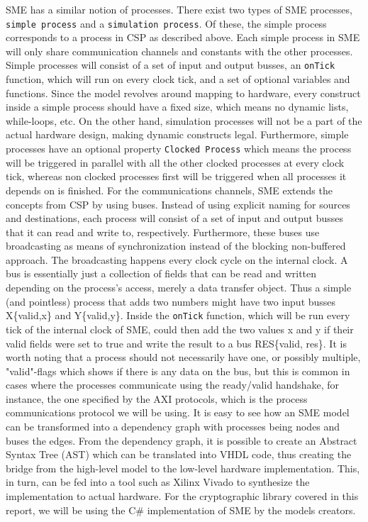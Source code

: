 \documentclass[a4paper, openany]{book}
\begin{document}
\begin{abstact}
SME has a similar notion of processes. There exist two types of SME processes, \texttt{simple process} and a \texttt{simulation process}. Of these, the simple process corresponds to a process in CSP as described above. Each simple process in SME will only share communication channels and constants with the other processes. Simple processes will consist of a set of input and output busses, an \texttt{onTick} function, which will run on every clock tick, and a set of optional variables and functions. Since the model revolves around mapping to hardware, every construct inside a simple process should have a fixed size, which means no dynamic lists, while-loops, etc. On the other hand, simulation processes will not be a part of the actual hardware design, making dynamic constructs legal. Furthermore, simple processes have an optional property \texttt{Clocked Process} which means the process will be triggered in parallel with all the other clocked processes at every clock tick, whereas non clocked processes first will be triggered when all processes it depends on is finished.
For the communications channels, SME extends the concepts from CSP by using buses. Instead of using explicit naming for sources and destinations, each process will consist of a set of input and output busses that it can read and write to, respectively. Furthermore, these buses use broadcasting as means of synchronization instead of the blocking non-buffered approach.  The broadcasting happens every clock cycle on the internal clock.
A bus is essentially just a collection of fields that can be read and written depending on the process's access, merely a data transfer object. Thus a simple (and pointless) process that adds two numbers might have two input busses X\{valid,x\} and Y\{valid,y\}. Inside the \texttt{onTick} function, which will be run every tick of the internal clock of SME, could then add the two values x and y if their valid fields were set to true and write the result to a bus RES\{valid, res\}. It is worth noting that a process should not necessarily have one, or possibly multiple, "valid"-flags which shows if there is any data on the bus, but this is common in cases where the processes communicate using the ready/valid handshake, for instance, the one specified by the AXI protocols, which is the process communications protocol we will be using. It is easy to see how an SME model can be transformed into a dependency graph with processes being nodes and buses the edges. From the dependency graph, it is possible to create an Abstract Syntax Tree (AST) which can be translated into VHDL code\cite{sme}, thus creating the bridge from the high-level model to the low-level hardware implementation. This, in turn, can be fed into a tool such as Xilinx Vivado to synthesize the implementation to actual hardware. For the cryptographic library covered in this report, we will be using the C\# implementation of SME by the models creators\cite{sme}.

\end{abstact}
\end{document}
